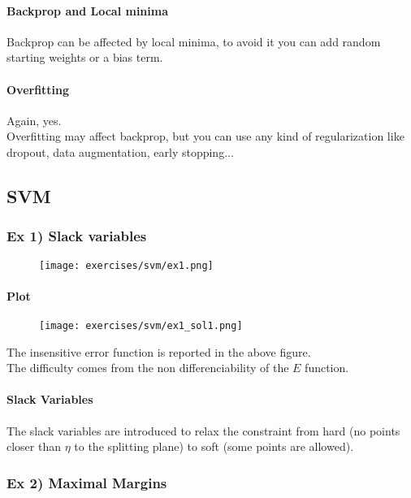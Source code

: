 \paragraph{Backprop and Local minima}
Backprop can be affected by local minima, to avoid it  you can add random starting weights or a bias term.

\paragraph{Overfitting}
Again, yes. \\
Overfitting may affect backprop, but you can use any kind of regularization like dropout, data augmentation, early stopping...

\subsection{SVM}


\subsubsection{Ex 1) Slack variables}

\begin{figure}[H]
    \centering
    \texttt{[image: exercises/svm/ex1.png]}
\end{figure}

\paragraph{Plot}
\begin{figure}[H]
    \centering
    \texttt{[image: exercises/svm/ex1\_sol1.png]}
\end{figure}
The insensitive error function is reported in the above figure.\\
The difficulty comes from the non differenciability of the $E$ function.

\paragraph{Slack Variables}
The slack variables are introduced to relax the constraint from hard (no points closer than $\eta$ to the splitting plane) to soft (some points are allowed).


\subsubsection{Ex 2) Maximal Margins}


